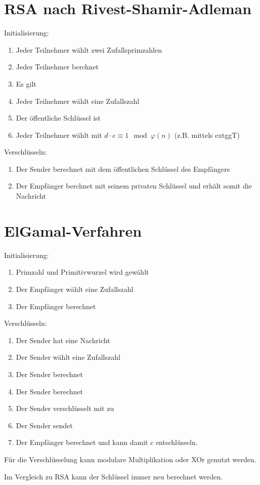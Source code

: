 \section{RSA nach Rivest-Shamir-Adleman}
Initialisierung:
\begin{enumerate}
    \item Jeder Teilnehmer wählt zwei Zufallsprimzahlen 
    \item Jeder Teilnehmer berchnet 
    \item Es gilt 
    \item Jeder Teilnehmer wählt eine Zufallszahl 
    \item Der öffentliche Schlüssel ist 
    \item Jeder Teilnehmer wählt  mit $d \cdot e \equiv 1 \mod \varphi(n)$
        (z.B. mittels extggT)
\end{enumerate}
Verschlüsseln:
\begin{enumerate}
    \item Der Sender berechnet  mit dem öffentlichen Schlüssel
        des Empfängers
    \item Der Empfänger berchnet  mit seinem privaten Schlüssel
        und erhält somit die Nachricht
\end{enumerate}

\section{ElGamal-Verfahren}
Initialisierung:
\begin{enumerate}
    \item
        Primzahl  und Primitivwurzel  wird gewählt
    \item
        Der Empfänger wählt eine Zufallszahl 
    \item
        Der Empfänger berechnet 
\end{enumerate}
Verschlüsseln:
\begin{enumerate}
    \item
        Der Sender hat eine Nachricht 
    \item
        Der Sender wählt eine Zufallszahl 
    \item
        Der Sender berechnet 
    \item
        Der Sender berechnet 
    \item
        Der Sender verschlüsselt  mit  zu 
    \item
        Der Sender sendet 
    \item
        Der Empfänger berechnet  und kann
        damit $c$ entschlüsseln.
\end{enumerate}
Für die Verschlüsselung kann modulare Multiplikation oder XOr genutzt werden.

Im Vergleich zu RSA kann der Schlüssel immer neu berechnet werden.

